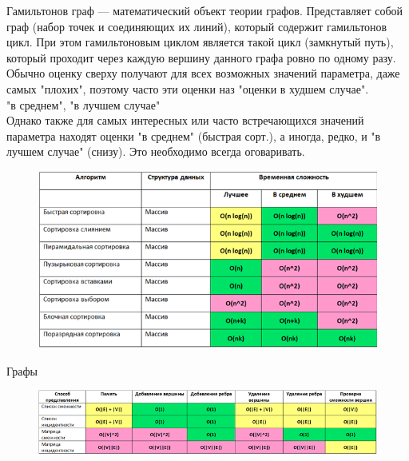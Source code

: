 \documentclass[main]{subfiles}
\begin{document}
    Гамильтонов граф — математический объект теории графов. Представляет собой граф (набор точек и соединяющих их линий), который содержит гамильтонов цикл. При этом гамильтоновым циклом является такой цикл (замкнутый путь), который проходит через каждую вершину данного графа ровно по одному разу.\\

    Обычно оценку сверху получают для всех возможных значений параметра, даже самых "плохих"{}, поэтому часто эти оценки наз "оценки в худшем случае"{}.\\

    "в среднем"{}, "в лучшем случае"{}\\
    Однако также для самых интересных или часто встречающихся значений параметра находят оценки "в среднем"{} (быстрая сорт.), а иногда, редко, и "в лучшем случае" (снизу). Это необходимо всегда оговаривать.
    \begin{figure}[H]
        \includegraphics[width = 13cm]{pics/2_1}
        \centring
    \end{figure}
    Графы
    \begin{figure}[H]
        \includegraphics[width = 13cm]{pics/2_2}
        \centring
    \end{figure}
\end{document}
